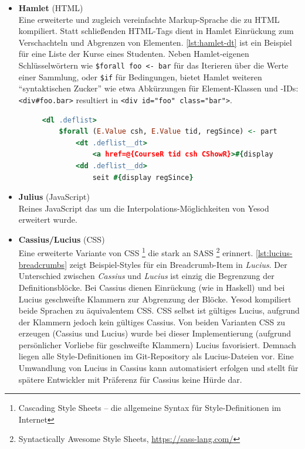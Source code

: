 \documentclass[11pt,a4paper,twoside,ngerman]{article}
\begin{document}
\begin{itemize}
    \item \textbf{Hamlet} (HTML) \hfill \\ Eine erweiterte und zugleich vereinfachte Markup-Sprache die zu HTML kompiliert. Statt schließenden HTML-Tags dient in Hamlet Einrückung zum Verschachteln und Abgrenzen von Elementen. \autoref{lst:hamlet-dt} ist ein Beispiel für eine Liste der Kurse eines Studenten.
    Neben Hamlet-eigenen Schlüsselwörtern wie \lstinline!$forall foo <- bar! für das Iterieren über die Werte einer Sammlung, oder \lstinline!$if! für Bedingungen, bietet Hamlet weiteren "`syntaktischen Zucker"' wie etwa Abkürzungen für Element-Klassen und -IDs: \lstinline{<div#foo.bar>} resultiert in \lstinline{<div id="foo" class="bar">}.
    
    \begin{figure}[ht]
      \begin{lstlisting}[language=Hamlet, caption={\textit{Hamlet}-Code zur Darstellung einer Liste (mit Haskell-Interpolationen)}, label={lst:hamlet-dt}]
<dl .deflist>
    $forall (E.Value csh, E.Value tid, regSince) <- participant
        <dt .deflist__dt>
            <a href=@{CourseR tid csh CShowR}>#{display tid} - #{csh}
        <dd .deflist__dd>
            seit #{display regSince}
      \end{lstlisting}
    \end{figure}
    
    \item \textbf{Julius} (JavaScript) \hfill \\ Reines JavaScript das um die Interpolations-Möglichkeiten von Yesod erweitert wurde.
    
    \item \textbf{Cassius/Lucius} (CSS) \hfill \\ Eine erweiterte Variante von CSS \footnote{Cascading Style Sheets -- die allgemeine Syntax für Style-Definitionen im Internet} die stark an SASS \footnote{Syntactically Awesome Style Sheets, \url{https://sass-lang.com/}} erinnert. \autoref{lst:lucius-breadcrumbs} zeigt Beispiel-Styles für ein Breadcrumb-Item in \textit{Lucius}. Der Unterschied zwischen \textit{Cassius} und \textit{Lucius} ist einzig die Begrenzung der Definitionsblöcke. Bei Cassius dienen Einrückung (wie in Haskell) und bei Lucius geschweifte Klammern zur Abgrenzung der Blöcke. Yesod kompiliert beide Sprachen zu äquivalentem CSS. CSS selbst ist gültiges Lucius, aufgrund der Klammern jedoch kein gültiges Cassius.
    Von beiden Varianten CSS zu erzeugen (Cassius und Lucius) wurde bei dieser Implementierung (aufgrund persönlicher Vorliebe für geschweifte Klammern) Lucius favorisiert. Demnach liegen alle Style-Definitionen im Git-Repository als Lucius-Dateien vor. Eine Umwandlung von Lucius in Cassius kann automatisiert erfolgen und stellt für spätere Entwickler mit Präferenz für Cassius keine Hürde dar.
    

\end{itemize}
\end{document}
